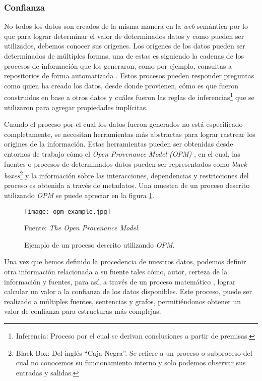 \subsubsection{Confianza}

No todos los datos son creados de la misma manera en la \textit{web} semántica por lo que para lograr determinar el valor de determinados datos y como pueden ser utilizados, debemos conocer sus orígenes. Los orígenes de los datos pueden ser determinados de múltiples formas, una de estas es siguiendo la cadenas de los procesos de información que los generaron, como por ejemplo, consultas a repositorios de forma automatizada \cite{dividino2009querying} \cite{flouris2009coloring}. Estos procesos pueden responder preguntas como quien ha creado los datos, desde donde provienen, cómo es que fueron construidos en base a otros datos y cuáles fueron las reglas de inferencias\footnote{Inferencia: Proceso por el cual se derivan conclusiones a partir de premisas.} que se utilizaron para agregar propiedades implícitas.

Cuando el proceso por el cual los datos fueron generados no está especificado completamente, se necesitan herramientas más abstractas para lograr rastrear los origines de la información. Estas herramientas pueden ser obtenidas desde entornos de trabajo cómo el \textit{Open Provenance Model (OPM)} \cite{moreau2008open}, en el cual, las fuentes o procesos de determinados datos pueden ser representados como \textit{black boxes}\footnote{Black Box: Del inglés ``Caja Negra''. Se refiere a un proceso o subproceso del cual no conocemos su funcionamiento interno y solo podemos observar sus entradas y salidas.} y la información sobre las interacciones, dependencias y restricciones del proceso es obtenida a través de metadatos. Una muestra de un proceso descrito utilizando \textit{OPM} se puede apreciar en la figura \ref{fig:opm-example}.

\begin{figure}
    \centering
    \texttt{[image: opm-example.jpg]}
    \caption{Ejemplo de un proceso descrito utilizando \textit{OPM}.} Fuente:
    \textit{The Open Provenance Model}.
    \label{fig:opm-example}
\end{figure}

Una vez que hemos definido la procedencia de nuestros datos, podemos definir otra información relacionada a su fuente tales cómo, autor, certeza de la información y fuentes, para así, a través de un proceso matemático \cite{dividino2009provenance}, lograr calcular un valor a la confianza de los datos disponibles. Este proceso, puede ser realizado a múltiples fuentes, sentencias y grafos, permitiéndonos obtener un valor de confianza para estructuras más complejas.

